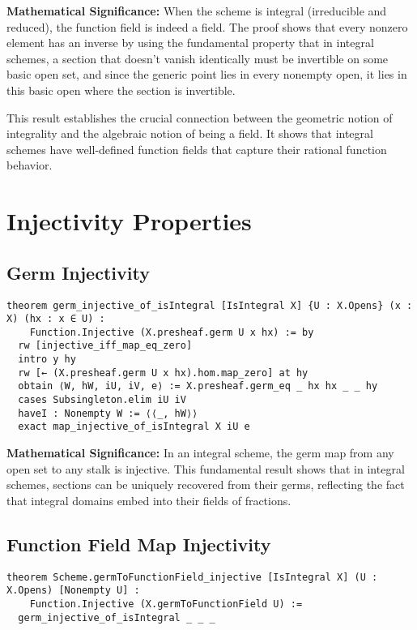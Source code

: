 \documentclass{article}
\theoremstyle{definition}
\begin{document}
\textbf{Mathematical Significance:} When the scheme is integral (irreducible and reduced), the function field is indeed a field. The proof shows that every nonzero element has an inverse by using the fundamental property that in integral schemes, a section that doesn't vanish identically must be invertible on some basic open set, and since the generic point lies in every nonempty open, it lies in this basic open where the section is invertible.

This result establishes the crucial connection between the geometric notion of integrality and the algebraic notion of being a field. It shows that integral schemes have well-defined function fields that capture their rational function behavior.

\section{Injectivity Properties}

\subsection{Germ Injectivity}

\begin{lstlisting}
theorem germ_injective_of_isIntegral [IsIntegral X] {U : X.Opens} (x : X) (hx : x ∈ U) :
    Function.Injective (X.presheaf.germ U x hx) := by
  rw [injective_iff_map_eq_zero]
  intro y hy
  rw [← (X.presheaf.germ U x hx).hom.map_zero] at hy
  obtain ⟨W, hW, iU, iV, e⟩ := X.presheaf.germ_eq _ hx hx _ _ hy
  cases Subsingleton.elim iU iV
  haveI : Nonempty W := ⟨⟨_, hW⟩⟩
  exact map_injective_of_isIntegral X iU e
\end{lstlisting}

\textbf{Mathematical Significance:} In an integral scheme, the germ map from any open set to any stalk is injective. This fundamental result shows that in integral schemes, sections can be uniquely recovered from their germs, reflecting the fact that integral domains embed into their fields of fractions.

\subsection{Function Field Map Injectivity}

\begin{lstlisting}
theorem Scheme.germToFunctionField_injective [IsIntegral X] (U : X.Opens) [Nonempty U] :
    Function.Injective (X.germToFunctionField U) :=
  germ_injective_of_isIntegral _ _ _
\end{lstlisting}
\end{document}
